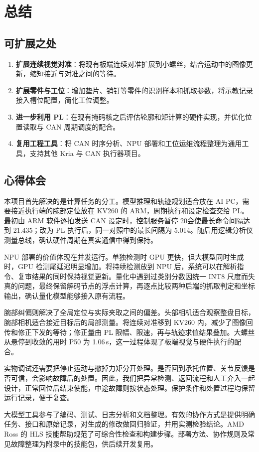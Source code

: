 \section{总结}

\subsection{可扩展之处}

\begin{enumerate}
  \item \textbf{扩展连续视觉对准}：将现有板端连续对准扩展到小螺丝，结合运动中的图像更新，缩短接近与对准之间的等待。
  \item \textbf{扩展零件与工位}：增加垫片、销钉等零件的识别样本和抓取参数，将示教记录接入槽位配置，简化工位调整。
  \item \textbf{进一步利用 PL}：在现有掩码核之后评估轮廓和矩计算的硬件实现，并优化位置读取与 CAN 周期调度的配合。
  \item \textbf{复用工程工具}：将 CAN 时序分析、NPU 部署和工位运维流程整理为通用工具，支持其他 Kria 与 CAN 执行器项目。
\end{enumerate}

\subsection{心得体会}

本项目首先解决的是计算任务的分工。模型推理和轨迹规划适合放在 AI PC，需要接近执行端的腕部定位放在 KV260 的 ARM，周期执行和设定检查交给 PL。最初由 ARM 软件逐拍发送 CAN 设定时，控制服务暂停 20\ms 会使最长命令间隔达到 21.435\ms；改为 PL 执行后，同一对照中的最长间隔为 5.014\ms。随后用逻辑分析仪测量总线，确认硬件周期在真实通信中得到保持。

NPU 部署的价值体现在并发运行。单独检测时 GPU 更快，但大模型同时生成时，GPU 检测尾延迟明显增加。将持续检测放到 NPU 后，系统可以在解析指令、复审结果的同时保持视觉更新。量化中遇到过类别分数因统一 INT8 尺度而失真的问题，最终保留解码节点的浮点计算，再逐点比较两种后端的抓取判定和坐标输出，确认量化模型能够接入原有流程。

腕部纠偏则解决了全局定位与实际夹取之间的偏差。头部相机适合观察整盘目标，腕部相机适合接近目标后的局部测量。将连续对准移到 KV260 内，减少了图像回传和修正下发的等待；修正量由 PL 限幅、限速，再与轨迹求值结果叠加。大螺丝从悬停到收敛的用时 P50 为 1.06\,s，这一过程体现了板端视觉与硬件执行的配合。

实物调试还需要把停止运动与撤掉力矩分开处理。是否回到承托位置、关节反馈是否可信，会影响故障后的处置。因此，我们把异常检测、返回流程和人工介入一起设计，正常回位后结束使能，中途故障则按状态处理。保护条件和处置过程均保留运行记录，便于复查。

大模型工具参与了编码、测试、日志分析和文档整理。有效的协作方式是提供明确任务、接口和原始记录，对生成的修改做回归验证，并用实测检验结论。AMD Ross 的 HLS 技能帮助规范了可综合性检查和构建步骤。部署方法、协作规则及常见故障整理为附录中的技能包，供后续开发复用。
